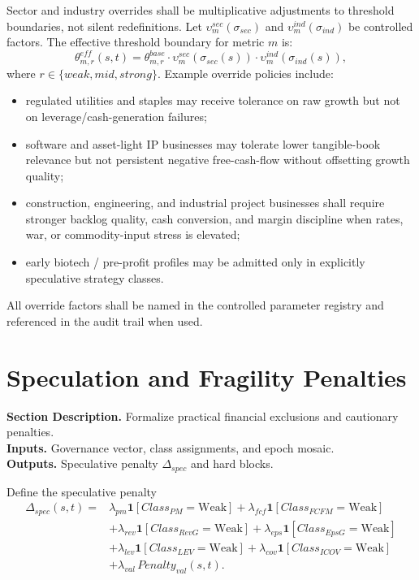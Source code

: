 \documentclass[11pt]{report}
\newcommand{\meta}[3]{\textbf{Section Description.} #1\\
\textbf{Inputs.} #2\\
\textbf{Outputs.} #3\par}
\begin{document}
Sector and industry overrides shall be multiplicative adjustments to threshold boundaries, not silent redefinitions. Let $\upsilon_m^{sec}(\sigma_{sec})$ and $\upsilon_m^{ind}(\sigma_{ind})$ be controlled factors. The effective threshold boundary for metric $m$ is:
\[
\theta^{eff}_{m,r}(s,t)=\theta_{m,r}^{base}\cdot \upsilon_m^{sec}(\sigma_{sec}(s))\cdot \upsilon_m^{ind}(\sigma_{ind}(s)),
\]
where $r\in\{weak,mid,strong\}$. Example override policies include:
\begin{itemize}
    \item regulated utilities and staples may receive tolerance on raw growth but not on leverage/cash-generation failures;
    \item software and asset-light IP businesses may tolerate lower tangible-book relevance but not persistent negative free-cash-flow without offsetting growth quality;
    \item construction, engineering, and industrial project businesses shall require stronger backlog quality, cash conversion, and margin discipline when rates, war, or commodity-input stress is elevated;
    \item early biotech / pre-profit profiles may be admitted only in explicitly speculative strategy classes.
\end{itemize}
All override factors shall be named in the controlled parameter registry and referenced in the audit trail when used.

\section{Speculation and Fragility Penalties}
\meta{Formalize practical financial exclusions and cautionary penalties.}{Governance vector, class assignments, and epoch mosaic.}{Speculative penalty $\Delta_{spec}$ and hard blocks.}

Define the speculative penalty
\begin{align*}
\Delta_{spec}(s,t)=&\lambda_{pm}\mathbf{1}[Class_{PM}=\text{Weak}]
+\lambda_{fcf}\mathbf{1}[Class_{FCFM}=\text{Weak}] \\
&+\lambda_{rev}\mathbf{1}[Class_{RevG}=\text{Weak}]
+\lambda_{eps}\mathbf{1}[Class_{EpsG}=\text{Weak}] \\
&+\lambda_{lev}\mathbf{1}[Class_{LEV}=\text{Weak}]
+\lambda_{cov}\mathbf{1}[Class_{ICOV}=\text{Weak}] \\
&+\lambda_{val}\,Penalty_{val}(s,t).
\end{align*}
\end{document}
